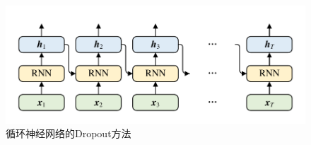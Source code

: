 \begin{figure}[htb]
	\centering
	\includegraphics[page=2, width=0.75\linewidth]{images/structure.pdf}
	\caption{循环神经网络的Dropout方法}
	\label{fig:dropout}
\end{figure}